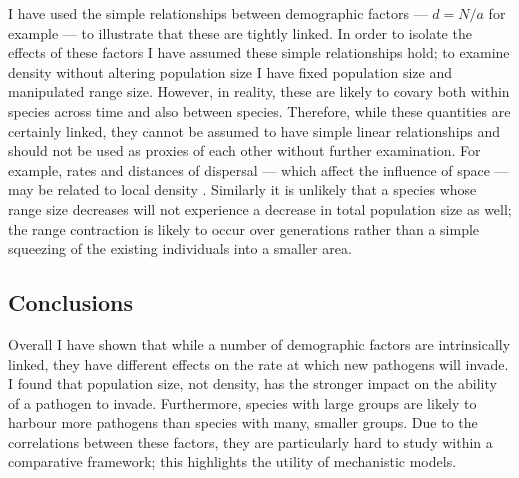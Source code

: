 
I have used the simple relationships between demographic factors --- $d = N / a$ for example --- to illustrate that these are tightly linked.
In order to isolate the effects of these factors I have assumed these simple relationships hold; to examine density without altering population size I have fixed population size and manipulated range size.
However, in reality, these are likely to covary both within species across time and also between species.
Therefore, while these quantities are certainly linked, they cannot be assumed to have simple linear relationships and should not be used as proxies of each other without further examination.
For example, rates and distances of dispersal --- which affect the influence of space --- may be related to local density \cite{marjamaki2013local}.
Similarly it is unlikely that a species whose range size decreases will not experience a decrease in total population size as well; the range contraction is likely to occur over generations rather than a simple squeezing of the existing individuals into a smaller area.




\subsection{Conclusions}

Overall I have shown that while a number of demographic factors are intrinsically linked, they have different effects on the rate at which new pathogens will invade.
I found that population size, not density, has the stronger impact on the ability of a pathogen to invade.
Furthermore, species with large groups are likely to harbour more pathogens than species with many, smaller groups.
Due to the correlations between these factors, they are particularly hard to study within a comparative framework; this highlights the utility of mechanistic models.












